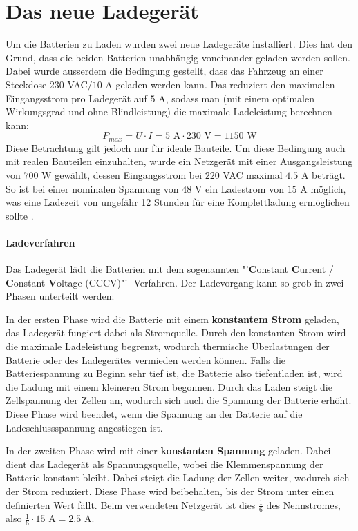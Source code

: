 \section{Das neue Ladegerät}
Um die Batterien zu Laden wurden zwei neue Ladegeräte installiert. Dies hat den Grund, dass die beiden Batterien unabhängig voneinander geladen werden sollen. Dabei wurde ausserdem die Bedingung gestellt, dass das Fahrzeug an einer Steckdose $230$ VAC/$10$ A geladen werden kann. Das reduziert den maximalen Eingangsstrom pro Ladegerät auf $5$ A, sodass man (mit einem optimalen Wirkungsgrad und ohne Blindleistung) die maximale Ladeleistung berechnen kann:
\begin{equation*}
	P_{max}=U\cdot I=5\text{ A}\cdot230\text{ V}=1150\text{ W}
\end{equation*}
Diese Betrachtung gilt jedoch nur für ideale Bauteile. Um diese Bedingung auch mit realen Bauteilen einzuhalten, wurde ein Netzgerät mit einer Ausgangsleistung von $700$ W gewählt, dessen Eingangsstrom bei $220$ VAC maximal $4.5$ A beträgt. So ist bei einer nominalen Spannung von $48$ V ein Ladestrom von $15$ A möglich, was eine Ladezeit von ungefähr 12 Stunden für eine Komplettladung ermöglichen sollte \cite{ladegeraet}.

\paragraph{Ladeverfahren}
Das Ladegerät lädt die Batterien mit dem sogenannten "'\textbf{C}onstant \textbf{C}urrent / \textbf{C}onstant \textbf{V}oltage (CCCV)"' -Verfahren. Der Ladevorgang kann so grob in zwei Phasen unterteilt werden:

In der ersten Phase wird die Batterie mit einem \textbf{konstantem Strom} geladen, das Ladegerät fungiert dabei als Stromquelle. Durch den konstanten Strom wird die maximale Ladeleistung begrenzt, wodurch thermische Überlastungen der Batterie oder des Ladegerätes vermieden werden können. Falls die Batteriespannung zu Beginn sehr tief ist, die Batterie also tiefentladen ist, wird die Ladung mit einem kleineren Strom begonnen. Durch das Laden steigt die Zellspannung der Zellen an, wodurch sich auch die Spannung der Batterie erhöht. Diese Phase wird beendet, wenn die Spannung an der Batterie auf die Ladeschlussspannung angestiegen ist.

In der zweiten Phase wird mit einer \textbf{konstanten Spannung} geladen. Dabei dient das Ladegerät als Spannungsquelle, wobei die Klemmenspannung der Batterie konstant bleibt. Dabei steigt die Ladung der Zellen weiter, wodurch sich der Strom reduziert. Diese Phase wird beibehalten, bis der Strom unter einen definierten Wert fällt. Beim verwendeten Netzgerät ist dies $\frac{1}{6}$ des Nennstromes, also $\frac{1}{6}\cdot 15\text{ A}=2.5\text{ A}$.

